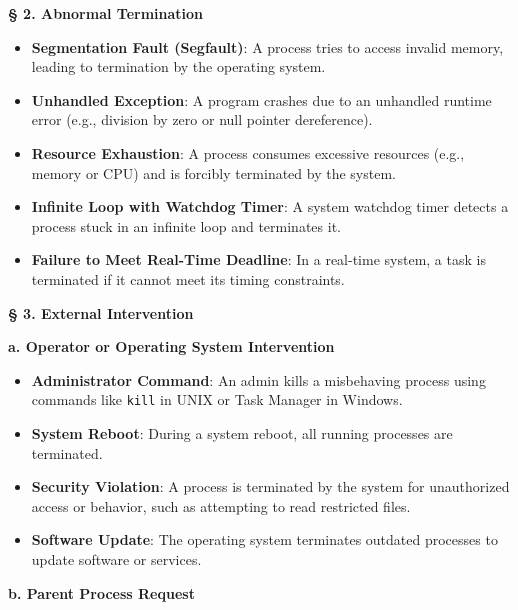 \documentclass[a4paper]{book}
\newcommand{\sfbf}[1]{{\normalsize\textsf{\textbf{§ #1}}}}
\begin{document}
\hrulefill

\sfbf{2. Abnormal Termination}

\begin{itemize}
\item 
\textbf{Segmentation Fault (Segfault)}: A process tries to access invalid memory, leading to termination by the operating system.

\item 
\textbf{Unhandled Exception}: A program crashes due to an unhandled runtime error (e.g., division by zero or null pointer dereference).

\item 
\textbf{Resource Exhaustion}: A process consumes excessive resources (e.g., memory or CPU) and is forcibly terminated by the system.

\item 
\textbf{Infinite Loop with Watchdog Timer}: A system watchdog timer detects a process stuck in an infinite loop and terminates it.

\item 
\textbf{Failure to Meet Real-Time Deadline}: In a real-time system, a task is terminated if it cannot meet its timing constraints.

\end{itemize}

\hrulefill

\sfbf{3. External Intervention}

\textbf{a. Operator or Operating System Intervention}

\begin{itemize}
\item 
\textbf{Administrator Command}: An admin kills a misbehaving process using commands like \verb|kill| in UNIX or Task Manager in Windows.

\item 
\textbf{System Reboot}: During a system reboot, all running processes are terminated.

\item 
\textbf{Security Violation}: A process is terminated by the system for unauthorized access or behavior, such as attempting to read restricted files.

\item 
\textbf{Software Update}: The operating system terminates outdated processes to update software or services.

\end{itemize}

\textbf{b. Parent Process Request}
\end{document}
